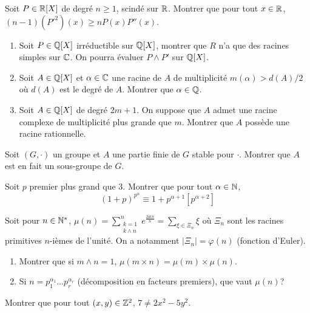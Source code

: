 \begin{exercise}
	Soit $P\in\mathbb{R}[X]$ de degré $n\geqslant1$, scindé sur $\mathbb{R}$. Montrer que pour
	tout $x\in\mathbb{R}$, $(n-1)(P'^{2})(x)\geqslant nP(x)P''(x)$.
\end{exercise}

\begin{exercise}
	\phantom{}
	\begin{enumerate}
		\item
		Soit $P\in\mathbb{Q}[X]$ irréductible sur $\mathbb{Q}[X]$, montrer que $R$ n'a que des
		racines simples sur $\mathbb{C}$. On pourra évaluer $P\wedge P'$ sur $\mathbb{Q}[X]$.
		\item
		Soit $A\in\mathbb{Q}[X]$ et $\alpha\in\mathbb{C}$ une racine de $A$ de multiplicité
		$m(\alpha)>d(A)/2$ où $d(A)$ est le degré de $A$. Montrer que
		$\alpha\in\mathbb{Q}$.
		\item
		Soit $A\in\mathbb{Q}[X]$ de degré $2m+1$. On suppose que $A$ admet une racine
		complexe de multiplicité plus grande que $m$. Montrer que $A$ possède une
		racine rationnelle.
	\end{enumerate}
\end{exercise}

\begin{exercise}
	Soit $(G,\cdot)$ un groupe et $A$ une partie finie de $G$ stable pour $\cdot$.
	Montrer que $A$ est en fait un sous-groupe de $G$.
\end{exercise}

\begin{exercise}
	Soit $p$ premier plus grand que 3. Montrer que pour tout $\alpha\in\mathbb{N}$,
	$$(1+p)^{p^{\alpha}}\equiv 1+p^{\alpha+1}[p^{\alpha+2}]$$
\end{exercise}

\begin{exercise}
	Soit pour $n\in\mathbb{N}^{*}$, $\mu(n)=\sum_{\substack{k=1\\k\wedge
	n}}^{n}e^{\frac{2\mathrm{i}k\pi}{n}}=\sum_{\xi\in\Xi_{n}}\xi$ où $\Xi_{n}$
	sont les racines primitives $n$-ièmes de l'unité. On a notamment
	$\vert\Xi_{n}\vert=\varphi(n)$ (fonction d'Euler).
	\begin{enumerate}
		\item
		Montrer que si $m\wedge n=1$, $\mu(m\times n)=\mu(m)\times\mu(n)$.
		\item
		Si $n=p_{1}^{\alpha_{1}}\dots p_{r}^{\alpha_{r}}$ (décomposition en
		facteurs premiers), que vaut $\mu(n)$?
	\end{enumerate}
\end{exercise}

\begin{exercise}
	Montrer que pour tout $(x,y)\in\mathbb{Z}^{2}$, $7\neq 2x^{2}-5y^{2}$.
\end{exercise}

